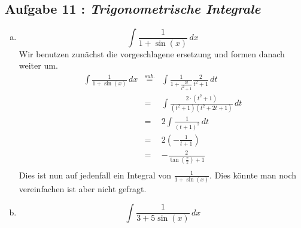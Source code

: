 \documentclass[11pt,a4paper,ngerman]{article}
\begin{document}
\subsection*{Aufgabe 11 : \mdseries\itshape Trigonometrische Integrale}

\begin{enumerate}[a.]
    \addtocounter{enumi}{6}
    \item
        $$
            \int \frac{1}{1+\sin (x)} \, dx
        $$
        Wir benutzen zunächst die vorgeschlagene ersetzung und formen danach weiter um.
        $$\begin{array}{rcl}
            \int \frac{1}{1+\sin(x)} \, dx
                &\stackrel{sub.}{=}& \int \frac{1}{1+\frac{2t}{t^2 + 1}} \frac{2}{t^2 +1} \, dt\\
                &=& \int \frac{2\cdot (t^2 + 1)}{(t^2 + 1)(t^2 +2t + 1)} \, dt\\
                &=& 2 \int \frac{1}{(t+1)^2} \, dt\\
                &=& 2 (-\frac{1}{t+1})\\
                &=& -\frac{2}{\tan(\frac{x}{2}) + 1}\\
        \end{array}$$
        Dies ist nun auf jedenfall ein Integral von $\frac{1}{1+\sin(x)}$. Dies könnte man noch vereinfachen
        ist aber nicht gefragt. 
    \item
        $$
            \int \frac{1}{3 + 5 \sin (x)} \, dx
        $$
        
\end{enumerate}


\label{LastPage}
\end{document}
